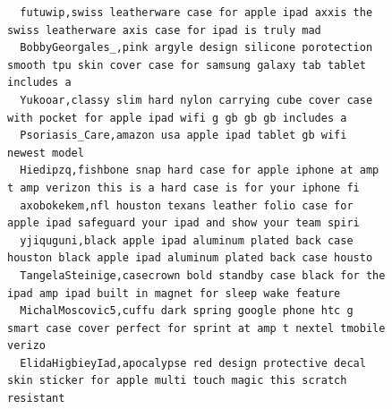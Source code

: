 \begin{figure}[htpb]
\begin{verbatim}
  futuwip,swiss leatherware case for apple ipad axxis the swiss leatherware axis case for ipad is truly mad
  BobbyGeorgales_,pink argyle design silicone porotection smooth tpu skin cover case for samsung galaxy tab tablet includes a
  Yukooar,classy slim hard nylon carrying cube cover case with pocket for apple ipad wifi g gb gb gb includes a
  Psoriasis_Care,amazon usa apple ipad tablet gb wifi newest model
  Hiedipzq,fishbone snap hard case for apple iphone at amp t amp verizon this is a hard case is for your iphone fi
  axobokekem,nfl houston texans leather folio case for apple ipad safeguard your ipad and show your team spiri
  yjiquguni,black apple ipad aluminum plated back case houston black apple ipad aluminum plated back case housto
  TangelaSteinige,casecrown bold standby case black for the ipad amp ipad built in magnet for sleep wake feature
  MichalMoscovic5,cuffu dark spring google phone htc g smart case cover perfect for sprint at amp t nextel tmobile verizo
  ElidaHigbieyIad,apocalypse red design protective decal skin sticker for apple multi touch magic this scratch resistant


\end{verbatim}
\end{figure}
